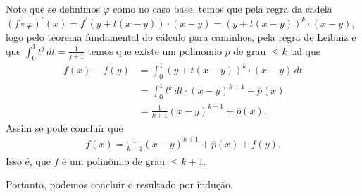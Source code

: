 \begin{homeworkProblem}[Seção 3-4]
\begin{solution}
\begin{itemize}
        Note que se definimos $\varphi$ como no caso base, temos que pela regra da cadeia $(f\circ \varphi)^{\prime}(x)=f^{\prime}(y+t(x-y))\cdot (x-y)=\left( y+t(x-y) \right)^{k}\cdot (x-y)$, logo pelo teorema fundamental do cálculo para caminhos, pela regra de Leibniz e que $\int_{0}^{1}t^{j}\,dt=\frac{1}{j+1}$ temos que existe um polinomio $\overline{p}$ de grau $\leq k$ tal que 
        \begin{align*}
          f(x)-f(y)&=\int_{0}^{1}(y+t(x-y))^{k}\cdot (x-y)\,dt\\
          &= \int_{0}^{1}t^{k}\,dt \cdot (x-y)^{k+1} + \overline{p}(x)\\
          &= \frac{1}{k+1}(x-y)^{k+1}+\overline{p}(x).
        \end{align*}
        Assim se pode concluir que
        \begin{align*}
          f(x)=\frac{1}{k+1}(x-y)^{k+1}+\overline{p}(x)+f(y).
        \end{align*}
        Isso é, que $f$ é um polinômio de grau $\leq k+1$. 
    \end{itemize}
    Portanto, podemos concluir o resultado por indução.
  \end{solution}
\end{homeworkProblem}
